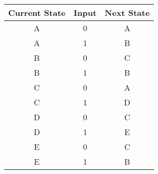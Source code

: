 \begin{table}[]
\begin{tabular}{|c|c|c|}
\hline
\rowcolor[HTML]{FD6864} 
Current State & Input & Next State \\ \hline
A             & 0     & A          \\ \hline
A             & 1     & B          \\ \hline
B             & 0     & C          \\ \hline
B             & 1     & B          \\ \hline
C             & 0     & A          \\ \hline
C             & 1     & D          \\ \hline
D             & 0     & C          \\ \hline
D             & 1     & E          \\ \hline
E             & 0     & C          \\ \hline
E             & 1     & B          \\ \hline
\end{tabular}
\end{table}